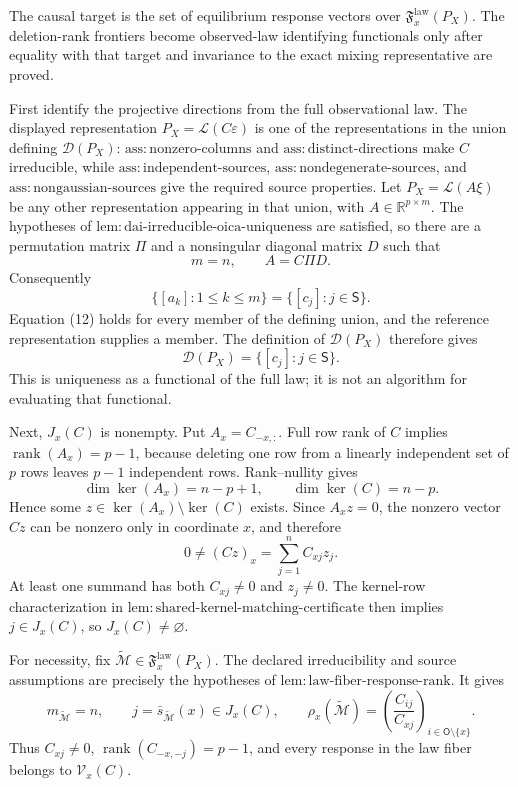 The causal target is the set of equilibrium response vectors over \(\mathfrak F_x^{\mathrm{law}}(P_X)\). The deletion-rank frontiers become observed-law identifying functionals only after equality with that target and invariance to the exact mixing representative are proved.

First identify the projective directions from the full observational law. The displayed representation \(P_X=\mathcal L(C\varepsilon)\) is one of the representations in the union defining \(\mathcal D(P_X)\): \(\mathrm{ass:nonzero\text{-}columns}\) and \(\mathrm{ass:distinct\text{-}directions}\) make \(C\) irreducible, while \(\mathrm{ass:independent\text{-}sources}\), \(\mathrm{ass:nondegenerate\text{-}sources}\), and \(\mathrm{ass:nongaussian\text{-}sources}\) give the required source properties. Let \(P_X=\mathcal L(A\xi)\) be any other representation appearing in that union, with \(A\in\mathbb R^{p\times m}\). The hypotheses of \(\mathrm{lem:dai\text{-}irreducible\text{-}oica\text{-}uniqueness}\) are satisfied, so there are a permutation matrix \(\Pi\) and a nonsingular diagonal matrix \(D\) such that
\[
 m=n,
 \qquad
 A=C\Pi D. \tag{11}
\]
Consequently
\[
 \{[a_k]:1\le k\le m\}=\{[c_j]:j\in\mathsf S\}. \tag{12}
\]
Equation (12) holds for every member of the defining union, and the reference representation supplies a member. The definition of \(\mathcal D(P_X)\) therefore gives
\[
 \mathcal D(P_X)=\{[c_j]:j\in\mathsf S\}. \tag{13}
\]
This is uniqueness as a functional of the full law; it is not an algorithm for evaluating that functional.

Next, \(J_x(C)\) is nonempty. Put \(A_x=C_{-x,:}\). Full row rank of \(C\) implies \(\operatorname{rank}(A_x)=p-1\), because deleting one row from a linearly independent set of \(p\) rows leaves \(p-1\) independent rows. Rank--nullity gives
\[
 \dim\ker(A_x)=n-p+1,
 \qquad
 \dim\ker(C)=n-p. \tag{14}
\]
Hence some \(z\in\ker(A_x)\setminus\ker(C)\) exists. Since \(A_xz=0\), the nonzero vector \(Cz\) can be nonzero only in coordinate \(x\), and therefore
\[
 0\ne(Cz)_x=\sum_{j=1}^n C_{xj}z_j. \tag{15}
\]
At least one summand has both \(C_{xj}\ne0\) and \(z_j\ne0\). The kernel-row characterization in \(\mathrm{lem:shared\text{-}kernel\text{-}matching\text{-}certificate}\) then implies \(j\in J_x(C)\), so \(J_x(C)\ne\varnothing\).

For necessity, fix \(\widetilde{\mathcal M}\in\mathfrak F_x^{\mathrm{law}}(P_X)\). The declared irreducibility and source assumptions are precisely the hypotheses of \(\mathrm{lem:law\text{-}fiber\text{-}response\text{-}rank}\). It gives
\[
 m_{\widetilde{\mathcal M}}=n,
 \qquad
 j=\bar s_{\widetilde{\mathcal M}}(x)\in J_x(C),
 \qquad
 \rho_x(\widetilde{\mathcal M})
 =\left(\frac{C_{ij}}{C_{xj}}\right)_{i\in\mathsf O\setminus\{x\}}. \tag{16}
\]
Thus \(C_{xj}\ne0\), \(\operatorname{rank}(C_{-x,-j})=p-1\), and every response in the law fiber belongs to \(\mathcal V_x(C)\).

